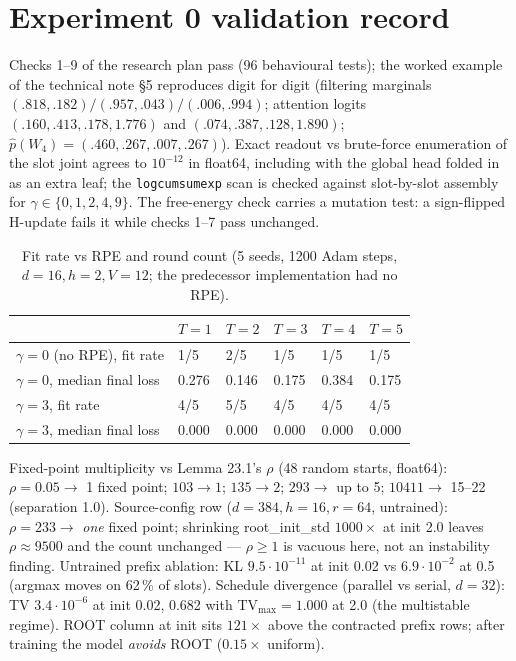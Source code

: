 \documentclass[10pt,a4paper]{article}
\begin{document}
\appendix
\section{Experiment 0 validation record}

\sloppy Checks 1--9 of the research plan pass (96 behavioural tests); the worked example of the
technical note \S5 reproduces digit for digit (filtering marginals
$(.818,.182)/(.957,.043)/(.006,.994)$; attention logits $(.160,.413,.178,1.776)$ and
$(.074,.387,.128,1.890)$; $\hat p(W_4) = (.460,.267,.007,.267)$). Exact readout vs
brute-force enumeration of the slot joint agrees to $10^{-12}$ in float64, including with
the global head folded in as an extra leaf; the \texttt{logcumsumexp} scan is checked
against slot-by-slot assembly for $\gamma \in \{0,1,2,4,9\}$. The free-energy check carries
a mutation test: a sign-flipped H-update fails it while checks 1--7 pass unchanged.

\begin{table}[h]\centering\small
\caption{Fit rate vs RPE and round count (5 seeds, 1200 Adam steps, $d{=}16, h{=}2, V{=}12$;
the predecessor implementation had no RPE).}
\begin{tabular}{llllll}
\toprule
 & $T{=}1$ & $T{=}2$ & $T{=}3$ & $T{=}4$ & $T{=}5$\\
\midrule
$\gamma=0$ (no RPE), fit rate & 1/5 & 2/5 & 1/5 & 1/5 & 1/5\\
$\gamma=0$, median final loss & 0.276 & 0.146 & 0.175 & 0.384 & 0.175\\
$\gamma=3$, fit rate & 4/5 & 5/5 & 4/5 & 4/5 & 4/5\\
$\gamma=3$, median final loss & 0.000 & 0.000 & 0.000 & 0.000 & 0.000\\
\bottomrule
\end{tabular}
\end{table}

Fixed-point multiplicity vs Lemma 23.1's $\rho$ (48 random starts, float64): $\rho=0.05 \to$
1 fixed point; $103 \to 1$; $135 \to 2$; $293 \to$ up to 5; $10411 \to$ 15--22 (separation
1.0). Source-config row ($d{=}384, h{=}16, r{=}64$, untrained): $\rho=233 \to$ \emph{one}
fixed point; shrinking root\_init\_std $1000\times$ at init 2.0 leaves $\rho \approx 9500$
and the count unchanged --- $\rho \ge 1$ is vacuous here, not an instability finding.
Untrained prefix ablation: KL $9.5\cdot10^{-11}$ at init 0.02 vs $6.9\cdot10^{-2}$ at 0.5
(argmax moves on 62\,\% of slots). Schedule divergence (parallel vs serial, $d{=}32$): TV
$3.4\cdot10^{-6}$ at init 0.02, 0.682 with $\mathrm{TV}_{\max}=1.000$ at 2.0 (the
multistable regime). ROOT column at init sits $121\times$ above the contracted prefix rows;
after training the model \emph{avoids} ROOT ($0.15\times$ uniform).
\end{document}
